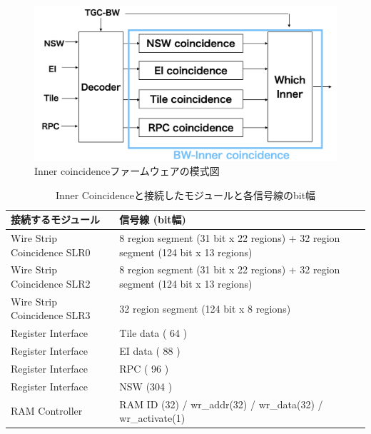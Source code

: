 \begin{figure} 
\centering
\includegraphics[width=16cm]{fig/SL/Inner_integrate.png}
\caption[Inner coincidenceファームウェアの模式図]{Inner coincidenceファームウェアの模式図\cite{mt_kobayashi}}
\label{Inner_integrate}
\end{figure}

\begin{table}[]
    \centering
    \caption{Inner Coincidenceと接続したモジュールと各信号線のbit幅}
    \label{tab:Inner_integrate}
    \begin{tabular}{|l|l|}
    \hline
    接続するモジュール                   & 信号線 (bit幅)                                                                       \\ \hline\hline
    Wire Strip Coincidence SLR0 & 8 region segment (31 bit x 22 regions) + 32 region segment (124 bit x 13 regions) \\ \hline
    Wire Strip Coincidence SLR2 & 8 region segment (31 bit x 22 regions) + 32 region segment (124 bit x 13 regions) \\ \hline
    Wire Strip Coincidence SLR3 & 32 region segment (124 bit x 8 regions)                                           \\ \hline
    Register Interface          & Tile data ( 64 )                                                                  \\ \hline
    Register Interface          & EI data ( 88 )                                                                    \\ \hline
    Register Interface          & RPC ( 96 )                                                                        \\ \hline
    Register Interface          & NSW (304 )                                                                        \\ \hline
    RAM Controller              & RAM ID (32) / wr\_addr(32) / wr\_data(32) / wr\_activate(1)                       \\ \hline
    \end{tabular}
\end{table}

